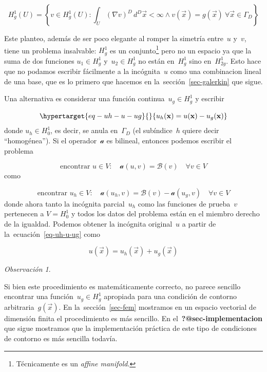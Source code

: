 \documentclass[
  12pt,
  a4paper,
  table]{scrbook}
\theoremstyle{plain}
\theoremstyle{definition}
\theoremstyle{plain}
\theoremstyle{plain}
\theoremstyle{remark}
\newtheorem*{remark}{Observación}
\begin{document}
\[
H^1_g (U) = \left\{ v \in H^1_g (U) : \int_U \left( \nabla v \right)^{D} \,d^D\vec{x} < \infty \wedge v(\vec{x}) = g(\vec{x})~\forall \vec{x} \in \Gamma_D  \right\}
\]

Este planteo, además de ser poco elegante al romper la simetría
entre~\(u\) y~\(v\), tiene un problema insalvable: \(H^1_g\) es un
conjunto\footnote{Técnicamente es un
  \foreignlanguage{american}{\emph{affine manifold}}.} pero no un
espacio ya que la suma de dos funciones \(u_1 \in H^1_g\)
y~\(u_2 \in H^1_g\) no están en~\(H^1_g\) sino en~\(H^1_{2g}\). Esto
hace que no podamos escribir fácilmente a la incógnita~\(u\) como una
combinacion lineal de una base, que es lo primero que hacemos en
la~sección~\ref{sec-galerkin} que sigue.

Una alternativa es considerar una función continua~\(u_g \in H^1_g\) y
escribir

\begin{equation}\protect\hypertarget{eq-uh-u-ug}{}{
u_h(\vec{x}) = u(\vec{x}) - u_g(\vec{x})
}\label{eq-uh-u-ug}\end{equation} donde \(u_h \in H^1_0\), es decir, se
anula en~\(\Gamma_D\) (el subíndice~\(h\) quiere decir ``homogénea'').
Si el operador~\(\mathcal{a}\) es bilineal, entonces podemos escribir el
problema

\[
\text{encontrar~} u \in V: \quad
\mathcal{a} \left(u, v\right) = \mathcal{B} \left(v\right)
\quad  \forall v \in V
\] como

\[
\text{encontrar~} u_h \in V: \quad
\mathcal{a} \left(u_h, v\right) = \mathcal{B} \left(v\right) - \mathcal{a} \left(u_g, v\right)
\quad  \forall v \in V
\] donde ahora tanto la incógnita parcial~\(u_h\) como las funciones de
prueba~\(v\) pertenecen a \(V = H^1_0\) y todos los datos del problema
están en el miembro derecho de la igualdad. Podemos obtener la incógnita
original~\(u\) a partir de la~ecuación~\ref{eq-uh-u-ug} como

\[
u(\vec{x}) = u_h(\vec{x}) + u_g(\vec{x})
\]

\begin{remark}

\label{remark-ug}

Si bien este procedimiento es matemáticamente correcto, no parece
sencillo encontrar una función~\(u_g \in H^1_g\) apropiada para una
condición de contorno arbitraria~\(g(\vec{x})\). En
la~sección~\ref{sec-fem} mostramos en un espacio vectorial de dimensión
finita el procedimiento es más sencillo. En
el~\textbf{?@sec-implementacion} que sigue mostramos que la
implementación práctica de este tipo de condiciones de contorno es más
sencilla todavía.

\end{remark}
\end{document}
